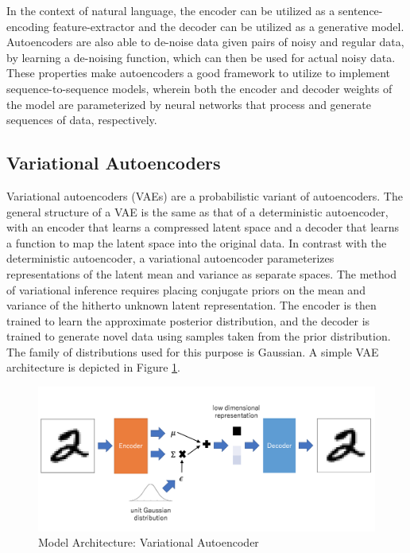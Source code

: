 In the context of natural language, the encoder can be utilized as a sentence-encoding feature-extractor and the decoder can be utilized as a generative model. Autoencoders are also able to de-noise data given pairs of noisy and regular data, by learning a de-noising function, which can then be used for actual noisy data. These properties make autoencoders a good framework to utilize to implement sequence-to-sequence models, wherein both the encoder and decoder weights of the model are parameterized by neural networks that process and generate sequences of data, respectively.

\subsection{Variational Autoencoders}

Variational autoencoders (VAEs) \citep{kingma2013auto} are a probabilistic variant of autoencoders. The general structure of a VAE is the same as that of a deterministic autoencoder, with an encoder that learns a compressed latent space and a decoder that learns a function to map the latent space into the original data. In contrast with the deterministic autoencoder, a variational autoencoder parameterizes representations of the latent mean and variance as separate spaces. The method of variational inference requires placing conjugate priors on the mean and variance of the hitherto unknown latent representation. The encoder is then trained to learn the approximate posterior distribution, and the decoder is trained to generate novel data using samples taken from the prior distribution. The family of distributions used for this purpose is Gaussian. A simple VAE architecture is depicted in Figure \ref{fig:vae-structure}.

\begin{figure}[ht]
	\centering
	\includegraphics[width=\textwidth]{images/vae-structure}
	\caption{\label{fig:vae-structure} Model Architecture: Variational Autoencoder}
\end{figure}

